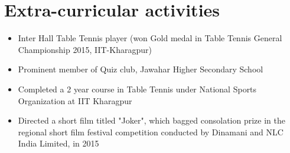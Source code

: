 \documentclass[10pt,a4paper]{moderncv}
\begin{document}


\section{Extra-curricular activities}

\begin{itemize}

 \item Inter Hall Table Tennis player (won Gold medal in Table Tennis General Championship 2015, IIT-Kharagpur)
 \item Prominent member of Quiz club, Jawahar Higher Secondary School
 \item Completed a 2 year course in Table Tennis under National Sports Organization at IIT Kharagpur
 \item Directed a short film titled "Joker", which bagged consolation prize in the regional short film festival competition conducted by Dinamani and NLC India Limited, in 2015
  
\end{itemize}
\end{document}
